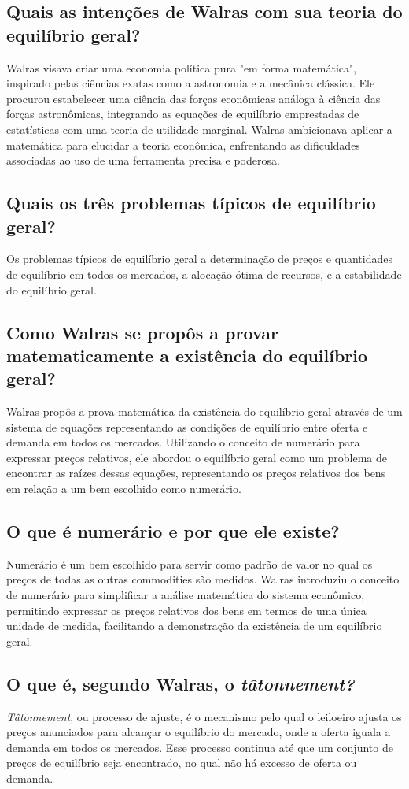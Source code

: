 \documentclass[a4paper,12pt]{article}[abntex2]
\begin{document}
\subsection{\textbf{Quais as intenções de Walras com sua teoria do equilíbrio geral?}}
Walras visava criar uma economia política pura "em forma matemática", inspirado pelas ciências exatas como a astronomia e a mecânica clássica. Ele procurou estabelecer uma ciência das forças econômicas análoga à ciência das forças astronômicas, integrando as equações de equilíbrio emprestadas de estatísticas com uma teoria de utilidade marginal. Walras ambicionava aplicar a matemática para elucidar a teoria econômica, enfrentando as dificuldades associadas ao uso de uma ferramenta precisa e poderosa.
\subsection{\textbf{Quais os três problemas típicos de equilíbrio geral?}}
Os problemas típicos de equilíbrio geral a determinação de preços e quantidades de equilíbrio em todos os mercados, a alocação ótima de recursos, e a estabilidade do equilíbrio geral.
\subsection{\textbf{Como Walras se propôs a provar matematicamente a existência do equilíbrio geral?}}
Walras propôs a prova matemática da existência do equilíbrio geral através de um sistema de equações representando as condições de equilíbrio entre oferta e demanda em todos os mercados. Utilizando o conceito de numerário para expressar preços relativos, ele abordou o equilíbrio geral como um problema de encontrar as raízes dessas equações, representando os preços relativos dos bens em relação a um bem escolhido como numerário.
\subsection{\textbf{O que é numerário e por que ele existe?}}
Numerário é um bem escolhido para servir como padrão de valor no qual os preços de todas as outras commodities são medidos. Walras introduziu o conceito de numerário para simplificar a análise matemática do sistema econômico, permitindo expressar os preços relativos dos bens em termos de uma única unidade de medida, facilitando a demonstração da existência de um equilíbrio geral.
\subsection{\textbf{O que é, segundo Walras, o \textit{tâtonnement?}}}
\textit{Tâtonnement}, ou processo de ajuste, é o mecanismo pelo qual o leiloeiro ajusta os preços anunciados para alcançar o equilíbrio do mercado, onde a oferta iguala a demanda em todos os mercados. Esse processo continua até que um conjunto de preços de equilíbrio seja encontrado, no qual não há excesso de oferta ou demanda.
\end{document}
